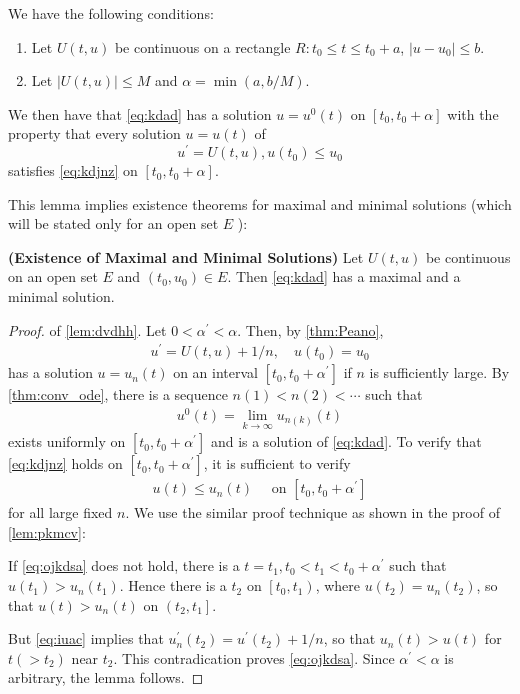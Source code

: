 \documentclass{article}
\newcommand{\bfs}[1]{\textbf{({#1}) }}
\begin{document}
\begin{lema}\label{lem:dvdhh}
We have the following conditions:
\begin{enumerate}
    \item Let $U(t, u)$ be continuous on a rectangle $R: t_{0}\le t\le t_{0}+a$, $\left|u-u_{0}\right|\le b$.
    \item Let $|U(t, u)|\le M$ and $\alpha=\min (a, b / M)$.
\end{enumerate}
We then have that \cref{eq:kdad} has a solution $u=u^{0}(t)$ on $\left[t_{0}, t_{0}+\alpha\right]$ with the property that every solution $u=u(t)$ of $$u^{\prime}=U(t, u), u\left(t_{0}\right)\le u_{0}$$ satisfies \cref{eq:kdjnz} on $\left[t_{0}, t_{0}+\alpha\right]$.
\end{lema} 
This lemma implies existence theorems for maximal and minimal solutions (which will be stated only for an open set $E$ ):
\begin{thma}\bfs{Existence of Maximal and Minimal Solutions}
Let $U(t, u)$ be continuous on an open set $E$ and $\left(t_{0}, u_{0}\right) \in E$. Then \cref{eq:kdad} has a maximal and a minimal solution.
\end{thma}
\begin{proof} of \cref{lem:dvdhh}. Let $0<\alpha^{\prime}<\alpha$. Then, by \cref{thm:Peano},
\begin{align}
u^{\prime}=U(t, u)+1 / n, \quad u\left(t_{0}\right)=u_{0}\label{eq:iuac}
\end{align}
has a solution $u=u_{n}(t)$ on an interval $\left[t_{0}, t_{0}+\alpha^{\prime}\right]$ if $n$ is sufficiently large. By \cref{thm:conv_ode}, there is a sequence $n(1)<n(2)<\cdots$ such that
\begin{align}
u^{0}(t)=\lim _{k \rightarrow \infty} u_{n(k)}(t)\label{eq:mzcvdf}
\end{align}
exists uniformly on $\left[t_{0}, t_{0}+\alpha^{\prime}\right]$ and is a solution of \cref{eq:kdad}.
To verify that \cref{eq:kdjnz} holds on $\left[t_{0}, t_{0}+\alpha^{\prime}\right]$, it is sufficient to verify
\begin{align}
u(t)\le u_{n}(t) \quad \text { on }\left[t_{0}, t_{0}+\alpha^{\prime}\right]\label{eq:ojkdsa}
\end{align}
for all large fixed $n$. We use the similar proof technique as shown in the proof of \cref{lem:pkmcv}:

If \cref{eq:ojkdsa} does not hold, there is a $t=t_{1}, t_{0}<t_{1}<t_{0}+\alpha^{\prime}$ such that $u\left(t_{1}\right)>u_{n}\left(t_{1}\right) .$ Hence there is a  $t_{2}$ on $\left[t_{0}, t_{1}\right)$, where $u\left(t_{2}\right)=u_{n}\left(t_{2}\right)$, so that $u(t)>u_{n}(t)$ on $\left(t_{2}, t_{1}\right]$. 

But \cref{eq:iuac} implies that $u_{n}^{\prime}\left(t_{2}\right)=u^{\prime}\left(t_{2}\right)+1 / n$, so that $u_{n}(t)>u(t)$ for $t\left(>t_{2}\right)$ near $t_{2}$. This contradication proves \cref{eq:ojkdsa}. Since $\alpha^{\prime}<\alpha$ is arbitrary, the lemma follows.
\end{proof}
\end{document}
